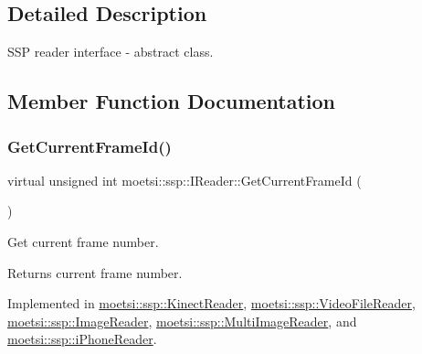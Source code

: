 \subsection{Detailed Description}
S\+SP reader interface -\/ abstract class. 

\subsection{Member Function Documentation}
\mbox{\label{classmoetsi_1_1ssp_1_1IReader_ac292d83eb06dee277baaa06e281a562d}} 
\subsubsection{\texorpdfstring{Get\+Current\+Frame\+Id()}{GetCurrentFrameId()}\hspace{0.1cm}{\footnotesize\ttfamily [1/2]}}
{\footnotesize\ttfamily virtual unsigned int moetsi\+::ssp\+::\+I\+Reader\+::\+Get\+Current\+Frame\+Id (\begin{DoxyParamCaption}{ }\end{DoxyParamCaption})\hspace{0.3cm}{\ttfamily [pure virtual]}}



Get current frame number. 

\begin{DoxyReturn}{Returns}
current frame number. 
\end{DoxyReturn}


Implemented in \hyperlink{classmoetsi_1_1ssp_1_1KinectReader_aa17e268723c41bdad5082575decb28eb}{moetsi\+::ssp\+::\+Kinect\+Reader}, \hyperlink{classmoetsi_1_1ssp_1_1VideoFileReader_aef5c92da2645cddc7e4ffcfd34ad4b8a}{moetsi\+::ssp\+::\+Video\+File\+Reader}, \hyperlink{classmoetsi_1_1ssp_1_1ImageReader_a386125736df9f25e5c4312bb679ff031}{moetsi\+::ssp\+::\+Image\+Reader}, \hyperlink{classmoetsi_1_1ssp_1_1MultiImageReader_a994eea20e9682c2f4afc9303a34c76f3}{moetsi\+::ssp\+::\+Multi\+Image\+Reader}, and \hyperlink{classmoetsi_1_1ssp_1_1iPhoneReader_a78792c6319743aed3ef2afc96fe16485}{moetsi\+::ssp\+::i\+Phone\+Reader}.

\mbox{\label{classmoetsi_1_1ssp_1_1IReader_ac292d83eb06dee277baaa06e281a562d}} 
